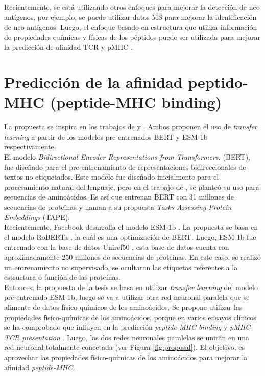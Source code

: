 Recientemente, se está utilizando otros enfoques para mejorar la detección de neo antígenos, por ejemplo, se puede utilizar datos MS para mejorar la identificación de neo antígenos. Luego, el enfoque basado en estructura que utiliza información de propiedades químicas y físicas de los péptidos puede ser utilizada para mejorar la predicción de afinidad TCR y pMHC \citep{borden2022cancer, gopanenko2020main}.\\


\section{Predicción de la afinidad peptido-MHC (peptide-MHC binding)}

La propuesta se inspira en los trabajos de \cite{cheng2021bertmhc} y \cite{hashemi2022improved}. Ambos proponen el uso de \textit{transfer  learning} a partir de los modelos pre-entrenados BERT \citep{devlin2018bert} y ESM-1b \citep{rives2021biological} respectivamente. \\


El modelo \textit{Bidirectional Encoder Representations from Transformers.} (BERT), fue diseñado para el pre-entrenamiento de representaciones bidireccionales de textos no etiquetados. Este modelo fue diseñado inicialmente para el procesamiento natural del lenguaje, pero en el trabajo de \cite{rao2019evaluating}, se planteó su uso para secuencias de aminoácidos. Es así que \cite{rao2019evaluating} entrenan BERT con 31 millones de secuencias de proteínas y llaman a su propuesta \textit{Tasks Assessing Protein Embeddings} (TAPE).\\

Recientemente, Facebook desarrolla el modelo ESM-1b \citep{rives2021biological}. La propuesta se basa en el modelo RoBERTa \citep{liu2019roberta}, la cuál es una optimización de BERT. Luego, ESM-1b fue entrenado con la base de datos Uniref50 \citep{suzek2015uniref}, esta base de datos cuenta con aproximadamente 250 millones de secuencias de proteínas. En este caso, se realizó un entrenamiento no supervisado, se ocultaron las etiquetas referentes a la estructura o función de las proteínas.\\

Entonces, la propuesta de la tesis se basa en utilizar \textit{transfer learning} del modelo pre-entrenado ESM-1b, luego se va a utilizar otra red neuronal paralela que se alimente de datos físico-químicos de los aminoácidos. Se propone utilizar las propiedades físico-químicas de los aminoácidos, porque en varios ensayos clínicos se ha comprobado que influyen en la predicción \textit{peptide-MHC binding} y \textit{pMHC-TCR presentation} \citep{gopanenko2020main, borden2022cancer}. Luego, las dos redes neuronales paralelas se unirán en una red neuronal totalmente conectada (ver Figura \ref{fig:proposal}). El objetivo, es aprovechar las propiedades físico-químicas de los aminoácidos para mejorar la afinidad \textit{peptide-MHC}.




